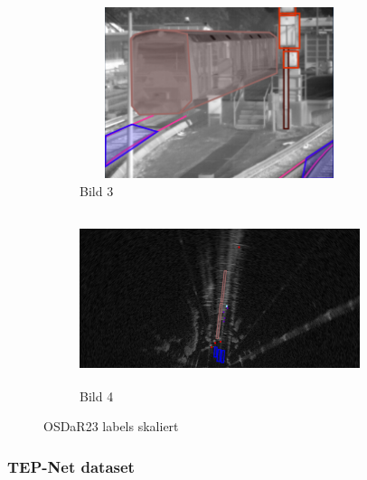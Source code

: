 \begin{figure}[H]
    \begin{subfigure}{0.45\textwidth}
        \centering
        \includegraphics[width=0.9\textwidth,height=5cm]{PICs/datasets/OSDaR23_dataset/labeled_IR.png}
        \caption{Bild 3}
    \end{subfigure}%
    \hspace{0.05\textwidth}
    \begin{subfigure}{0.45\textwidth}
        \centering
        \includegraphics[width=0.9\textwidth,height=5cm]{PICs/datasets/OSDaR23_dataset/labeled_Radar.png}
        \caption{Bild 4}
    \end{subfigure}
    
    \caption{OSDaR23 labels skaliert}
\end{figure}

\subsubsection{TEP-Net dataset}
\label{subsubsec:TEP-Net_dataset}


